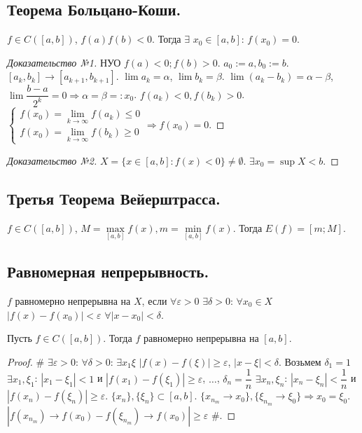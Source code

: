 \documentclass[12pt]{article}
\begin{document}
	\subsection{Теорема Больцано-Коши.}
	\begin{theorem}
		$f \in C([a, b])$, $f(a)f(b) < 0$. Тогда $\exists$ $x_0 \in [a, b]$: $f(x_0) = 0$.
	\end{theorem}
	\begin{proof}[Доказательство №1]
		НУО $f(a) < 0; f(b) > 0$. $a_0 := a, b_0 := b$. $[a_k, b_k] \rightarrow [a_{k + 1}, b_{k + 1}]$. $\lim a_k = \alpha$, $\lim b_k = \beta$. $\lim (a_k - b_k) = \alpha - \beta$, $\lim \dfrac{b - a}{2^k} = 0 \Rightarrow \alpha = \beta =: x_0$. $f(a_k) < 0, f(b_k) > 0$. $ \begin{cases}
			f(x_0) = \lim\limits_{k \rightarrow \infty} f(a_k) \leqslant 0 \\
			f(x_0) = \lim\limits_{k \rightarrow \infty} f(b_k) \geqslant 0
		\end{cases} \Rightarrow f(x_0) = 0$.
	\end{proof}
	\begin{proof}[Доказательство №2]
		$X = \{ x \in [a, b]: f(x) < 0 \} \not= \emptyset$. $\exists x_0 = \sup X < b$.
	\end{proof}
	\subsection{Третья Теорема Вейерштрасса.}
	\begin{theorem}
		$f \in C([a, b])$, $M = \max\limits_{[a, b]} f(x), m = \min\limits_{[a, b]} f(x)$. Тогда $E(f) = [m; M]$.
	\end{theorem}
	\subsection{Равномерная непрерывность.}
	\begin{definition}
		$f$ равномерно непрерывна на $X$, если $\forall \varepsilon > 0$ $\exists \delta > 0$: $\forall x_0 \in X$ $|f(x) - f(x_0)| < \varepsilon$ $\forall |x - x_0| < \delta$.
	\end{definition}
	\begin{theorem}
		Пусть $f \in C([a, b])$. Тогда $f$ равномерно непрерывна на $[a, b]$.
	\end{theorem}
	\begin{proof}
		$\#$ $\exists \varepsilon > 0$: $\forall \delta > 0$: $\exists x_1 \xi$ $|f(x) - f(\xi)| \geqslant \varepsilon$, $|x - \xi| < \delta$. Возьмем $\delta_1 = 1$ $\exists x_1, \xi_1$: $|x_1 - \xi_1| < 1$ и $|f(x_1) - f(\xi_1)| \geqslant \varepsilon$, $\dots$, $\delta_n = \dfrac{1}{n}$ $\exists x_n, \xi_n$: $|x_n - \xi_n| < \dfrac{1}{n}$ и $|f(x_n) - f(\xi_n)| \geqslant \varepsilon$. $\{ x_n \}, \{ \xi_n \} \subset [a, b]$. $\{ x_{n_m} \rightarrow x_0 \}, \{ \xi_{n_m} \rightarrow \xi_0 \} \Rightarrow x_0 = \xi_0$. $|f(x_{n_m}) \rightarrow f(x_0) - f(\xi_{n_m}) \rightarrow f(x_0)| \geqslant \varepsilon$ $\#$.
	\end{proof}
\end{document}
